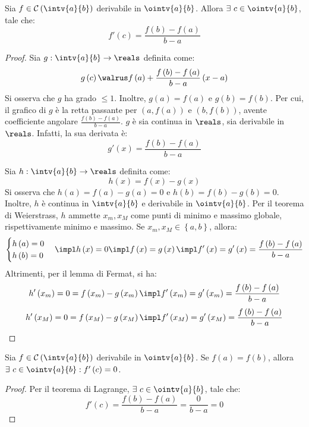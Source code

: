 \begin{theorem}
  Sia $f\in\mathcal{C}\left( \intv{a}{b} \right)$ derivabile in $\ointv{a}{b}$. Allora $\exists\ c\in\ointv{a}{b}$, tale che:
  $$f'\left( c \right)=\frac{f\left( b \right)-f\left( a \right)}{b-a}$$
\end{theorem}
\begin{proof}
  Sia $g:\intv{a}{b}\to\reals$ definita come:
  $$g\left( c \right)\walrus f\left( a \right)+\frac{f\left( b \right)-f\left( a \right)}{b-a}\left( x-a \right)$$
  Si osserva che $g$ ha grado $\le 1$.
  Inoltre, $g\left( a \right)=f\left( a \right)$ e $g\left( b \right)=f\left( b \right)$. Per cui, il grafico di $g$ è la retta passante per $\left( a,f\left( a \right) \right)$ e $\left( b,f\left( b \right) \right)$, avente coefficiente angolare $\frac{f\left( b \right)-f\left( a \right)}{b-a}$.
  $g$ è sia continua in $\reals$, sia derivabile in $\reals$. Infatti, la sua derivata è:
  $$g'\left( x \right)=\frac{f\left( b \right)-f\left( a \right)}{b-a}$$
  
  Sia $h:\intv{a}{b}\to\reals$ definita come:
  $$h\left( x \right)=f\left( x \right)-g\left( x \right)$$
  Si osserva che $h\left( a \right)=f\left( a \right)-g\left( a \right)=0$ e $h\left( b \right)=f\left( b \right)-g\left( b \right)=0$. Inoltre, $h$ è continua in $\intv{a}{b}$ e derivabile in $\ointv{a}{b}$. Per il teorema di Weierstrass, $h$ ammette $x_m,x_M$ come punti di minimo e massimo globale, rispettivamente minimo e massimo. Se $x_m,x_M\in\left\{ a,b \right\}$, allora:
  $$
    \begin{cases}
      h\left( a \right)=0 \\
      h\left( b \right)=0 \\
    \end{cases}
    \impl
    h\left( x \right)=0
    \impl
    f\left( x \right)=g\left( x \right)
    \impl
    f'\left( x \right)=g'\left( x \right)=\frac{f\left( b \right)-f\left( a \right)}{b-a}
  $$
  Altrimenti, per il lemma di Fermat, si ha:
  $$h'\left( x_m \right)=0=f\left( x_m \right)-g\left( x_m \right)\impl f'\left( x_m \right)=g'\left( x_m \right)=\frac{f\left( b \right)-f\left( a \right)}{b-a}$$
  $$h'\left( x_M \right)=0=f\left( x_M \right)-g\left( x_M \right)\impl f'\left( x_M \right)=g'\left( x_M \right)=\frac{f\left( b \right)-f\left( a \right)}{b-a}$$
\end{proof}

\begin{theorem}
  Sia $f\in\mathcal{C}\left( \intv{a}{b} \right)$ derivabile in $\ointv{a}{b}$. Se $f\left( a \right)=f\left( b \right)$, allora $\exists\ c\in\ointv{a}{b}:f'\left( c \right)=0$.
\end{theorem}
\begin{proof}
  Per il teorema di Lagrange, $\exists\ c\in\ointv{a}{b}$, tale che:
  $$f'\left( c \right)=\frac{f\left( b \right)-f\left( a \right)}{b-a}=\frac{0}{b-a}=0$$
\end{proof}

